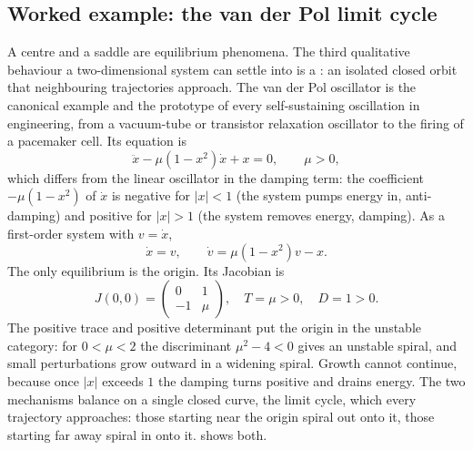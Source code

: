 \subsection{Worked example: the van der Pol limit cycle}

A centre and a saddle are equilibrium phenomena. The third
qualitative behaviour a two-dimensional system can settle into is a
: an isolated closed orbit that neighbouring
trajectories approach. The van der Pol oscillator is the canonical
example and the prototype of every self-sustaining oscillation in
engineering, from a vacuum-tube or transistor relaxation oscillator
to the firing of a pacemaker cell. Its equation is
\[
\ddot{x} - \mu(1 - x^{2})\dot{x} + x = 0, \qquad \mu > 0,
\]
which differs from the linear oscillator in the damping term: the
coefficient $-\mu(1 - x^{2})$ of $\dot{x}$ is negative for $|x| < 1$
(the system pumps energy in, anti-damping) and positive for $|x| >
1$ (the system removes energy, damping). As a first-order system
with $v = \dot{x}$,
\[
\dot{x} = v, \qquad \dot{v} = \mu(1 - x^{2})v - x.
\]
The only equilibrium is the origin. Its Jacobian is
\[
J(0, 0) = \begin{pmatrix} 0 & 1 \\ -1 & \mu \end{pmatrix}, \quad
T = \mu > 0, \quad D = 1 > 0.
\]
The positive trace and positive determinant put the origin in the
unstable category: for $0 < \mu < 2$ the discriminant $\mu^{2} - 4 <
0$ gives an unstable spiral, and small perturbations grow outward in
a widening spiral. Growth cannot continue, because once $|x|$
exceeds $1$ the damping turns positive and drains energy. The two
mechanisms balance on a single closed curve, the limit cycle, which
every trajectory approaches: those starting near the origin spiral
out onto it, those starting far away spiral in onto it.
 shows both.



